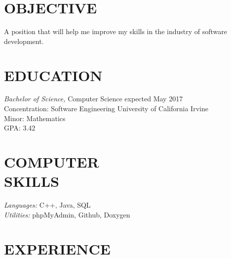 \documentclass[margin, 10pt]{res} %
\begin{document}
\begin{resume}

 
\section{OBJECTIVE}

A position that will help me improve my skills in the industry of software development.


\section{EDUCATION}

{\sl Bachelor of Science,} Computer Science \hfill expected May 2017 \\
Concentration: Software Engineering \hfill University of California Irvine \\
Minor: Mathematics \\
GPA: 3.42
 

\section{COMPUTER \\ SKILLS} 

{\sl Languages:}
C++, Java, SQL
\\
{\sl Utilities:}
phpMyAdmin, Github, Doxygen
 
 
\section{EXPERIENCE}


\end{resume}
\end{document}
